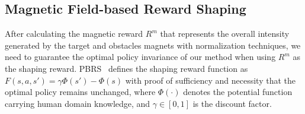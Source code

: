 \documentclass[journal]{IEEEtran}
\begin{document}
\subsection{Magnetic Field-based Reward Shaping}
After calculating the magnetic reward $R^m$ that represents the overall intensity generated by the target and obstacles magnets with normalization techniques, we need to guarantee the optimal policy invariance of our method when using $R^m$ as the shaping reward.
PBRS~\cite{ng1999policy} defines the shaping reward function as $F(s,a,s') = \gamma\Phi(s') - \Phi(s)$ with proof of sufficiency and necessity that the optimal policy remains unchanged, where $\Phi(\cdot)$ denotes the potential function carrying human domain knowledge, and $\gamma\in[0,1]$ is the discount factor.
\end{document}
